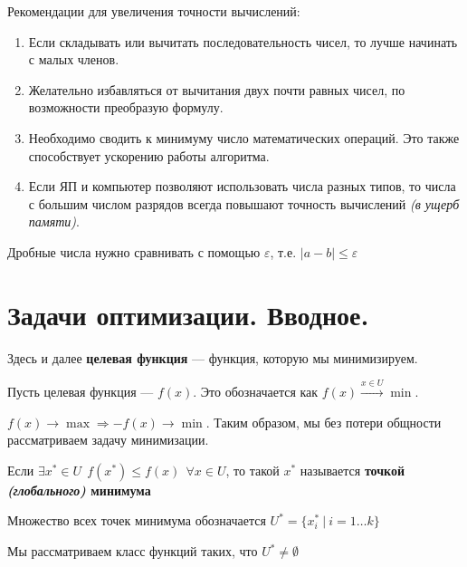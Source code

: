 \documentclass[12pt, a4paper, oneside]{book}
\begin{document}
Рекомендации для увеличения точности вычислений:
\begin{enumerate}
    \item Если складывать или вычитать последовательность чисел, то лучше начинать с малых членов. %
    \item Желательно избавляться от вычитания двух почти равных чисел, по возможности преобразую формулу.
    \item Необходимо сводить к минимуму число математических операций. Это также способствует ускорению работы алгоритма.
    \item Если ЯП и компьютер позволяют использовать числа разных типов, то числа с большим числом разрядов всегда повышают точность вычислений \textit{(в ущерб памяти)}. %
\end{enumerate}

Дробные числа нужно сравнивать с помощью \(\varepsilon\), т.е. \(|a - b| \leq \varepsilon\)

\section{Задачи оптимизации. Вводное.}

Здесь и далее \textbf{целевая функция} --- функция, которую мы минимизируем.

\begin{obozn}
    Пусть целевая функция --- \(f(x)\). Это обозначается как \(f(x) \xrightarrow{x\in U} \min\).

    \(f(x) \to \max \Rightarrow - f(x) \to \min\). Таким образом, мы без потери общности рассматриваем задачу минимизации.
\end{obozn}

\begin{definition}
    Если \(\exists x^* \in U \ \ f(x^*) \leq f(x) \ \ \forall x\in U\), то такой \(x^*\) называется \textbf{точкой \textit{(глобального)} минимума}
\end{definition}

\begin{obozn}
    Множество всех точек минимума обозначается \(U^* = \{x^*_i\ |\ i = 1\dots k\} \)
\end{obozn}

Мы рассматриваем класс функций таких, что \(U^* \neq \emptyset\)
\end{document}
